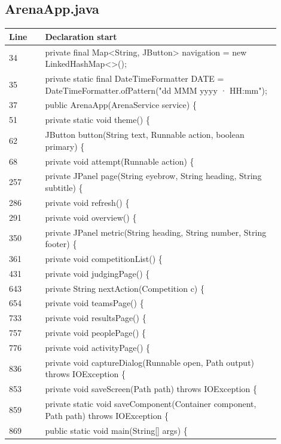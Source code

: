 \subsection*{ArenaApp.java}
\begin{longtable}{p{0.12\linewidth}p{0.78\linewidth}}\toprule Line & Declaration start\\\midrule\endhead
34 & private final Map<String, JButton> navigation = new LinkedHashMap<>();\\
35 & private static final DateTimeFormatter DATE = DateTimeFormatter.ofPattern("dd MMM yyyy · HH:mm");\\
37 & public ArenaApp(ArenaService service) \{\\
51 & private static void theme() \{\\
62 & JButton button(String text, Runnable action, boolean primary) \{\\
68 & private void attempt(Runnable action) \{\\
257 & private JPanel page(String eyebrow, String heading, String subtitle) \{\\
286 & private void refresh() \{\\
291 & private void overview() \{\\
350 & private JPanel metric(String heading, String number, String footer) \{\\
361 & private void competitionList() \{\\
431 & private void judgingPage() \{\\
643 & private String nextAction(Competition c) \{\\
654 & private void teamsPage() \{\\
733 & private void resultsPage() \{\\
757 & private void peoplePage() \{\\
776 & private void activityPage() \{\\
836 & private void captureDialog(Runnable open, Path output) throws IOException \{\\
853 & private void saveScreen(Path path) throws IOException \{\\
859 & private static void saveComponent(Container component, Path path) throws IOException \{\\
869 & public static void main(String[] args) \{\\
\bottomrule\end{longtable}
